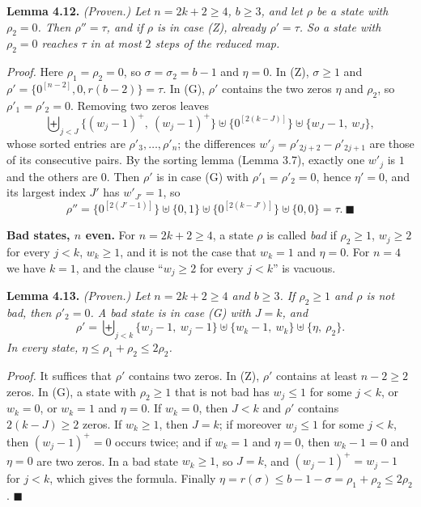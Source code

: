 \documentclass[11pt,letterpaper]{article}
\theoremstyle{paperstyle}
\theoremstyle{paperstyledef}
\theoremstyle{paperstylerem}
\begin{document}
\textbf{Lemma 4.12.} \emph{(Proven.) Let \(n = 2k+2 \geq 4\), \(b \geq 3\), and let \(\rho\) be a state with \(\rho_2 = 0\). Then \(\rho'' = \tau\), and if \(\rho\) is in case (Z), already \(\rho' = \tau\). So a state with \(\rho_2 = 0\) reaches \(\tau\) in at most \(2\) steps of the reduced map.}

\emph{Proof.} Here \(\rho_1 = \rho_2 = 0\), so \(\sigma = \sigma_2 = b-1\) and \(\eta = 0\). In (Z), \(\sigma \geq 1\) and \(\rho' = \{0^{[n-2]}, 0, r(b-2)\} = \tau\). In (G), \(\rho'\) contains the two zeros \(\eta\) and \(\rho_2\), so \(\rho'_1 = \rho'_2 = 0\). Removing two zeros leaves \[\biguplus_{j<J} \{(w_j - 1)^+,\ (w_j - 1)^+\} \uplus \{0^{[2(k-J)]}\} \uplus \{w_J - 1,\ w_J\},\] whose sorted entries are \(\rho'_3, \dots, \rho'_n\); the differences \(w'_j = \rho'_{2j+2} - \rho'_{2j+1}\) are those of its consecutive pairs. By the sorting lemma (Lemma 3.7), exactly one \(w'_j\) is \(1\) and the others are \(0\). Then \(\rho'\) is in case (G) with \(\rho'_1 = \rho'_2 = 0\), hence \(\eta' = 0\), and its largest index \(J'\) has \(w'_{J'} = 1\), so \[\rho'' = \{0^{[2(J'-1)]}\} \uplus \{0, 1\} \uplus \{0^{[2(k-J')]}\} \uplus \{0, 0\} = \tau. \ \blacksquare\]

\textbf{Bad states, \(n\) even.} For \(n = 2k+2 \geq 4\), a state \(\rho\) is called \emph{bad} if \(\rho_2 \geq 1\), \(w_j \geq 2\) for every \(j < k\), \(w_k \geq 1\), and it is not the case that \(w_k = 1\) and \(\eta = 0\). For \(n = 4\) we have \(k = 1\), and the clause ``\(w_j \geq 2\) for every \(j < k\)'' is vacuous.

\textbf{Lemma 4.13.} \emph{(Proven.) Let \(n = 2k+2 \geq 4\) and \(b \geq 3\). If \(\rho_2 \geq 1\) and \(\rho\) is not bad, then \(\rho'_2 = 0\). A bad state is in case (G) with \(J = k\), and} \[\rho' = \biguplus_{j<k} \{w_j - 1,\ w_j - 1\} \uplus \{w_k - 1,\ w_k\} \uplus \{\eta,\ \rho_2\}.\] \emph{In every state, \(\eta \leq \rho_1 + \rho_2 \leq 2 \rho_2\).}

\emph{Proof.} It suffices that \(\rho'\) contains two zeros. In (Z), \(\rho'\) contains at least \(n - 2 \geq 2\) zeros. In (G), a state with \(\rho_2 \geq 1\) that is not bad has \(w_j \leq 1\) for some \(j < k\), or \(w_k = 0\), or \(w_k = 1\) and \(\eta = 0\). If \(w_k = 0\), then \(J < k\) and \(\rho'\) contains \(2(k-J) \geq 2\) zeros. If \(w_k \geq 1\), then \(J = k\); if moreover \(w_j \leq 1\) for some \(j < k\), then \((w_j - 1)^+ = 0\) occurs twice; and if \(w_k = 1\) and \(\eta = 0\), then \(w_k - 1 = 0\) and \(\eta = 0\) are two zeros. In a bad state \(w_k \geq 1\), so \(J = k\), and \((w_j - 1)^+ = w_j - 1\) for \(j < k\), which gives the formula. Finally \(\eta = r(\sigma) \leq b - 1 - \sigma = \rho_1 + \rho_2 \leq 2 \rho_2\). \(\blacksquare\)
\end{document}
